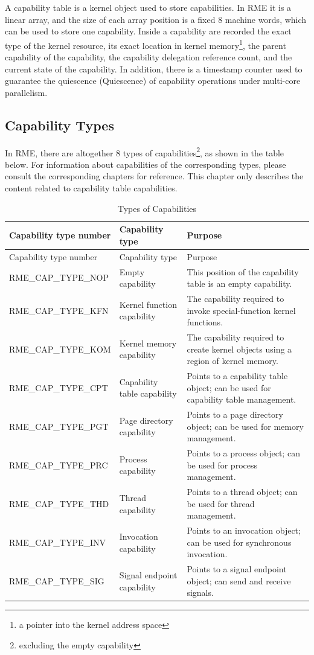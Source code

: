 A capability table is a kernel object used to store capabilities. In RME it is a linear array, and the size of each array position is a fixed 8 machine words, which can be used to store one capability. Inside a capability are recorded the exact type of the kernel resource, its exact location in kernel memory\footnote{a pointer into the kernel address space}, the parent capability of the capability, the capability delegation reference count, and the current state of the capability. In addition, there is a timestamp counter used to guarantee the quiescence (Quiescence) of capability operations under multi-core parallelism.

\subsection{Capability Types}\label{subsec:2-capability-types}

In RME, there are altogether 8 types of capabilities\footnote{excluding the empty capability}, as shown in the table below. For information about capabilities of the corresponding types, please consult the corresponding chapters for reference. This chapter only describes the content related to capability table capabilities.

\begin{xltabular}{\textwidth}{@{}>{\hsize\raggedright\arraybackslash}X>{\hsize\raggedright\arraybackslash}X>{\hsize\raggedright\arraybackslash}X@{}}
\caption{Types of Capabilities}\label{tab:2-1-capability-types}\\
\toprule
Capability type number & Capability type & Purpose\tabularnewline
\endfirsthead
\toprule
Capability type number & Capability type & Purpose\tabularnewline
\midrule
\endhead
\bottomrule
\endlastfoot
RME\_CAP\_TYPE\_NOP & Empty capability &
This position of the capability table is an empty capability.\tabularnewline
RME\_CAP\_TYPE\_KFN & Kernel function capability &
The capability required to invoke special-function kernel functions.\tabularnewline
RME\_CAP\_TYPE\_KOM & Kernel memory capability &
The capability required to create kernel objects using a region of kernel memory.\tabularnewline
RME\_CAP\_TYPE\_CPT & Capability table capability &
Points to a capability table object; can be used for capability table management.\tabularnewline
RME\_CAP\_TYPE\_PGT & Page directory capability &
Points to a page directory object; can be used for memory management.\tabularnewline
RME\_CAP\_TYPE\_PRC & Process capability &
Points to a process object; can be used for process management.\tabularnewline
RME\_CAP\_TYPE\_THD & Thread capability &
Points to a thread object; can be used for thread management.\tabularnewline
RME\_CAP\_TYPE\_INV & Invocation capability &
Points to an invocation object; can be used for synchronous invocation.\tabularnewline
RME\_CAP\_TYPE\_SIG & Signal endpoint capability &
Points to a signal endpoint object; can send and receive signals.\tabularnewline
\end{xltabular}
\nopagebreak[4]

